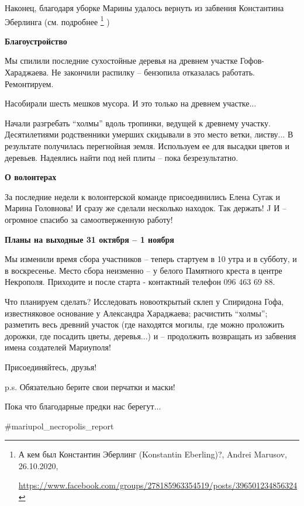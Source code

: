 Наконец, благодаря уборке Марины удалось вернуть из забвения Константина
Эберлинга (см. подробнее \footnote{А кем был Константин Эберлинг (Konstantin Eberling)?, Andrei Marusov, 26.10.2020, \par%
\url{https://www.facebook.com/groups/278185963354519/posts/396501234856324}}%
)

\textbf{Благоустройство}

Мы спилили последние сухостойные деревья на древнем участке Гофов-Хараджаева.
Не закончили распилку – бензопила отказалась работать. Ремонтируем.

Насобирали шесть мешков мусора. И это только на древнем участке...

Начали разгребать \enquote{холмы} вдоль тропинки, ведущей к древнему участку.
Десятилетиями родственники умерших скидывали в это место ветки, листву... В
результате получилась перегнойная земля. Используем ее для высадки цветов и
деревьев. Надеялись найти под ней плиты – пока безрезультатно.

\textbf{О волонтерах}

За последние недели к волонтерской команде присоединились Елена Сугак и Марина
Головнова! И сразу же сделали несколько находок. Так держать! J И – огромное
спасибо за самоотверженную работу!

\textbf{Планы на выходные 31 октября – 1 ноября}

Мы изменили время сбора участников – теперь стартуем в 10 утра и в субботу, и в
воскресенье. Место сбора неизменно – у белого Памятного креста в центре
Некрополя. Приходите и после старта - контактный телефон 096 463 69 88.

Что планируем сделать? Исследовать новооткрытый склеп у Спиридона Гофа,
известняковое основание у Александра Хараджаева; расчистить \enquote{холмы}; разметить
весь древний участок (где находятся могилы, где можно проложить дорожки, где
посадить цветы, деревья...) и – продолжить возвращать из забвения имена
создателей Мариуполя!

Присоединяйтесь, друзья!

p.s. Обязательно берите свои перчатки и маски!

Пока что благодарные предки нас берегут...

\#mariupol\_necropolis\_report
